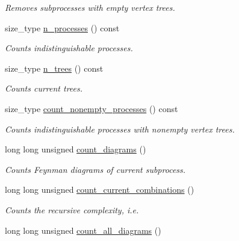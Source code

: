 \begin{DoxyCompactItemize}
\begin{DoxyCompactList}\small\item\em Removes subprocesses with empty vertex trees. \end{DoxyCompactList}\item 
\hypertarget{a00065_ac92fd247115dfa053bf7190c3fd50500}{}size\+\_\+type \hyperlink{a00065_ac92fd247115dfa053bf7190c3fd50500}{n\+\_\+processes} () const \label{a00065_ac92fd247115dfa053bf7190c3fd50500}

\begin{DoxyCompactList}\small\item\em Counts indistinguishable processes. \end{DoxyCompactList}\item 
\hypertarget{a00065_a9e25911d426e3427b3aa6737e526d2a1}{}size\+\_\+type \hyperlink{a00065_a9e25911d426e3427b3aa6737e526d2a1}{n\+\_\+trees} () const \label{a00065_a9e25911d426e3427b3aa6737e526d2a1}

\begin{DoxyCompactList}\small\item\em Counts current trees. \end{DoxyCompactList}\item 
\hypertarget{a00065_af7dd450ae8de745dba9770e047fdafe0}{}size\+\_\+type \hyperlink{a00065_af7dd450ae8de745dba9770e047fdafe0}{count\+\_\+nonempty\+\_\+processes} () const \label{a00065_af7dd450ae8de745dba9770e047fdafe0}

\begin{DoxyCompactList}\small\item\em Counts indistinguishable processes with nonempty vertex trees. \end{DoxyCompactList}\item 
\hypertarget{a00065_ab4219712736358f6de47885b29d706f7}{}long long unsigned \hyperlink{a00065_ab4219712736358f6de47885b29d706f7}{count\+\_\+diagrams} ()\label{a00065_ab4219712736358f6de47885b29d706f7}

\begin{DoxyCompactList}\small\item\em Counts Feynman diagrams of current subprocess. \end{DoxyCompactList}\item 
long long unsigned \hyperlink{a00065_a3f7fba8482b0038466cf79ffe3331a00}{count\+\_\+current\+\_\+combinations} ()
\begin{DoxyCompactList}\small\item\em Counts the recursive complexity, i.\+e. \end{DoxyCompactList}\item 
\hypertarget{a00065_a1e2be5beaaa4a7959dc7576d9a15c393}{}long long unsigned \hyperlink{a00065_a1e2be5beaaa4a7959dc7576d9a15c393}{count\+\_\+all\+\_\+diagrams} ()\label{a00065_a1e2be5beaaa4a7959dc7576d9a15c393}


\end{DoxyCompactItemize}
